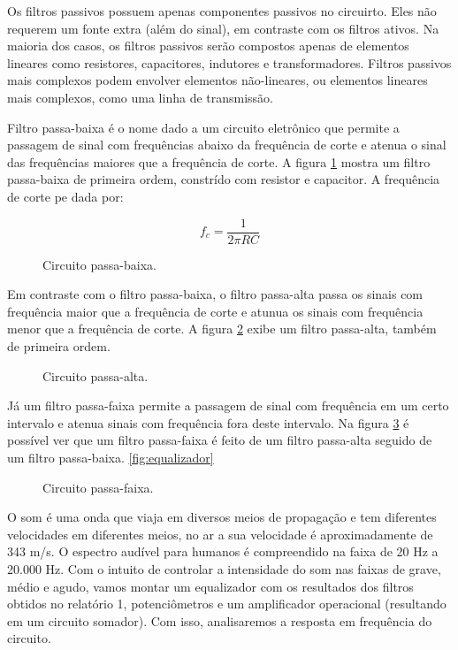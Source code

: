 \documentclass{article}
\begin{document}
Os filtros passivos possuem apenas componentes passivos no circuirto. Eles não requerem um fonte extra (além do sinal), em contraste com os filtros ativos. Na maioria dos casos, os filtros passivos serão compostos apenas de elementos lineares como resistores, capacitores, indutores e transformadores. Filtros passivos mais complexos podem envolver elementos não-lineares, ou elementos lineares mais complexos, como uma linha de transmissão. \cite{wiki-filtro-passivo}

Filtro passa-baixa é o nome dado a um circuito eletrônico que permite a passagem de sinal com frequências abaixo da frequência de corte e atenua o sinal das frequências maiores que a frequência de corte. \cite{wiki-passa-baixa} A figura \ref{fig:teo-passa-baixa} mostra um filtro passa-baixa de primeira ordem, constrído com resistor e capacitor. A frequência de corte pe dada por:

$$
  f_c = \frac{1}{2\pi RC}
$$

\begin{figure}[h!]
  \centering
  
  \caption{Circuito passa-baixa.}
  \label{fig:teo-passa-baixa}
\end{figure}

Em contraste com o filtro passa-baixa, o filtro passa-alta passa os sinais com frequência maior que a frequência de corte e atunua os sinais com frequência menor que a frequência de corte. A figura \ref{fig:teo-passa-alta} exibe um filtro passa-alta, também de primeira ordem. \cite{wiki-passa-alta}

\begin{figure}[h!]
  \centering
  
  \caption{Circuito passa-alta.}
  \label{fig:teo-passa-alta}
\end{figure}

Já um filtro passa-faixa permite a passagem de sinal com frequência em um certo intervalo e atenua sinais com frequência fora deste intervalo. \cite{wiki-passa-faixa} Na figura \ref{fig:teo-passa-faixa} é possível ver que um filtro passa-faixa é feito de um filtro passa-alta seguido de um filtro passa-baixa. \ref{fig:equalizador}

\begin{figure}[h!]
  \centering
  
  \caption{Circuito passa-faixa.}
  \label{fig:teo-passa-faixa}
\end{figure}

O som é uma onda que viaja em diversos meios de propagação e tem diferentes velocidades em diferentes meios, no ar a sua velocidade é aproximadamente de 343 m/s. O espectro audível para humanos é compreendido na faixa de 20 Hz a 20.000 Hz. Com o intuito de controlar a intensidade do som nas faixas de grave, médio e agudo, vamos montar um equalizador com os resultados dos filtros obtidos no relatório 1, potenciômetros e um amplificador operacional (resultando em um circuito somador). Com isso, analisaremos a resposta em frequência do circuito.
\end{document}
